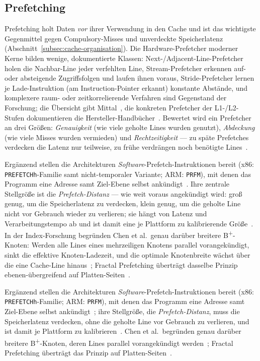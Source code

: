 \subsection{Prefetching}\label{subsec:prefetching}
Prefetching holt Daten \emph{vor} ihrer Verwendung in den Cache und ist das wichtigste Gegenmittel
gegen Compulsory-Misses und unverdeckte Speicherlatenz
(Abschnitt~\ref{subsec:cache-organisation}). Die Hardware-Prefetcher moderner Kerne bilden wenige,
dokumentierte Klassen: Next-/Adjacent-Line-Prefetcher holen die Nachbar-Line jeder verfehlten Line,
Stream-Prefetcher erkennen auf- oder absteigende Zugriffsfolgen und laufen ihnen voraus,
Stride-Prefetcher lernen je Lade-Instruktion (am Instruction-Pointer erkannt) konstante Abstände, und
komplexere raum- oder zeitkorrelierende Verfahren sind Gegenstand der Forschung; die Übersicht gibt
Mittal~\cite{mittal2016prefetching}, die konkreten Prefetcher der L1-/L2-Stufen dokumentieren die
Hersteller-Handbücher~\cite{intel_optimization,amd_sog}. Bewertet wird ein Prefetcher an drei Größen:
\emph{Genauigkeit} (wie viele geholte Lines wurden genutzt), \emph{Abdeckung} (wie viele Misses
wurden vermieden) und \emph{Rechtzeitigkeit} --- zu späte Prefetches verdecken die Latenz nur
teilweise, zu frühe verdrängen noch benötigte Lines~\cite{mittal2016prefetching}.

\begin{nurlang}
Ergänzend stellen die Architekturen \emph{Software}-Prefetch-Instruktionen bereit (x86:
\texttt{PREFETCHh}-Familie samt nicht-temporaler Variante; ARM\@: \texttt{PRFM}), mit denen das
Programm eine Adresse samt Ziel-Ebene selbst ankündigt~\cite{intel_sdm,arm_arm}. Ihre zentrale
Stellgröße ist die \emph{Prefetch-Distanz} --- wie weit voraus angekündigt wird: groß genug, um die
Speicherlatenz zu verdecken, klein genug, um die geholte Line nicht vor Gebrauch wieder zu verlieren;
sie hängt von Latenz und Verarbeitungstempo ab und ist damit eine je Plattform zu kalibrierende
Größe~\cite{mittal2016prefetching}. In der Index-Forschung begründen Chen et al.\ genau darüber
breitere B\textsuperscript{+}-Knoten: Werden alle Lines eines mehrzeiligen Knotens parallel
vorangekündigt, sinkt die effektive Knoten-Ladezeit, und die optimale Knotenbreite wächst über die
eine Cache-Line hinaus~\cite{chen2001prefetch}; Fractal Prefetching überträgt dasselbe Prinzip
ebenen-übergreifend auf Platten-Seiten~\cite{chen2002fractal}.
\end{nurlang}
\begin{nurkurz}
Ergänzend stellen die Architekturen \emph{Software}-Prefetch-Instruktionen bereit (x86: \texttt{PREFETCHh}-Familie;
ARM\@: \texttt{PRFM}), mit denen das Programm eine Adresse samt Ziel-Ebene selbst ankündigt~\cite{intel_sdm,arm_arm};
ihre Stellgröße, die \emph{Prefetch-Distanz}, muss die Speicherlatenz verdecken, ohne die geholte Line vor Gebrauch
zu verlieren, und ist damit je Plattform zu kalibrieren~\cite{mittal2016prefetching}. Chen et al.\ begründen genau
darüber breitere B\textsuperscript{+}-Knoten, deren Lines parallel vorangekündigt werden~\cite{chen2001prefetch};
Fractal Prefetching überträgt das Prinzip auf Platten-Seiten~\cite{chen2002fractal}.
\end{nurkurz}

